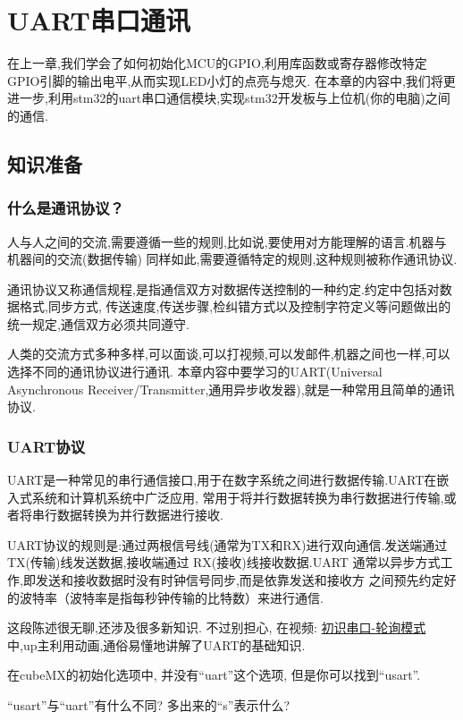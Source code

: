 \chapter{UART串口通讯}

在上一章,我们学会了如何初始化MCU的GPIO,利用库函数或寄存器修改特定GPIO引脚的输出电平,从而实现LED小灯的点亮与熄灭.
在本章的内容中,我们将更进一步,利用stm32的uart串口通信模块,实现stm32开发板与上位机(你的电脑)之间的通信.
\section{知识准备}

\subsection{什么是通讯协议？}

人与人之间的交流,需要遵循一些的规则,比如说,要使用对方能理解的语言.机器与机器间的交流(数据传输)
同样如此,需要遵循特定的规则,这种规则被称作通讯协议.

通讯协议又称通信规程,是指通信双方对数据传送控制的一种约定.约定中包括对数据格式,同步方式,
传送速度,传送步骤,检纠错方式以及控制字符定义等问题做出的统一规定,通信双方必须共同遵守.

人类的交流方式多种多样,可以面谈,可以打视频,可以发邮件,机器之间也一样,可以选择不同的通讯协议进行通讯.
本章内容中要学习的UART(Universal Asynchronous Receiver/Transmitter,通用异步收发器),就是一种常用且简单的通讯协议.

\subsection{UART协议}

UART是一种常见的串行通信接口,用于在数字系统之间进行数据传输.UART在嵌入式系统和计算机系统中广泛应用,
常用于将并行数据转换为串行数据进行传输,或者将串行数据转换为并行数据进行接收.

UART协议的规则是:通过两根信号线(通常为TX和RX)进行双向通信.发送端通过TX(传输)线发送数据,接收端通过
RX(接收)线接收数据.UART 通常以异步方式工作,即发送和接收数据时没有时钟信号同步,而是依靠发送和接收方
之间预先约定好的波特率（波特率是指每秒钟传输的比特数）来进行通信.

这段陈述很无聊,还涉及很多新知识. 不过别担心,
在视频: \href{https://www.bilibili.com/video/BV1Na4y1T7VQ/?spm_id_from=333.788&vd_source=a4cd8065d89f5e61e0854dbe3297fa49}{初识串口-轮询模式}
中,up主利用动画,通俗易懂地讲解了UART的基础知识.

\begin{theorem}

	在cubeMX的初始化选项中, 并没有“uart”这个选项, 但是你可以找到“usart”.

	“usart”与“uart”有什么不同? 多出来的“s”表示什么?

\end{theorem}

